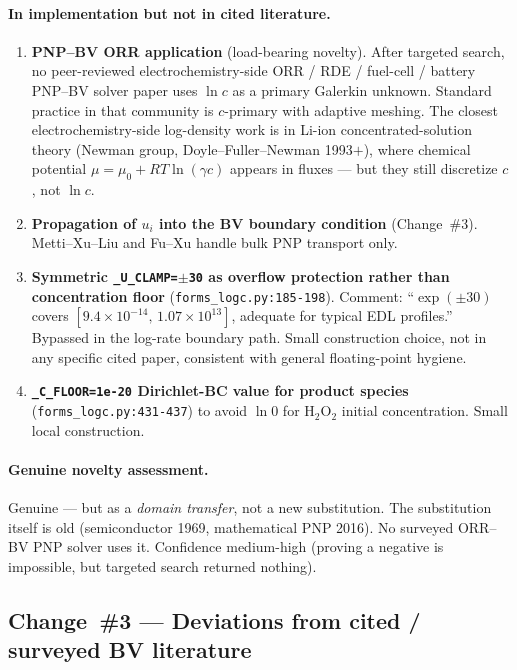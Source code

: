 \documentclass[11pt]{article}
\newcommand{\HtwoOtwo}{\mathrm{H}_2\mathrm{O}_2}
\begin{document}
\paragraph{In implementation but not in cited literature.}
\begin{enumerate}
\item \textbf{PNP--BV ORR application} (load-bearing novelty). After targeted
      search, no peer-reviewed electrochemistry-side ORR / RDE / fuel-cell /
      battery PNP--BV solver paper uses $\ln c$ as a primary Galerkin unknown.
      Standard practice in that community is $c$-primary with adaptive
      meshing. The closest electrochemistry-side log-density work is in Li-ion
      concentrated-solution theory (Newman group, Doyle--Fuller--Newman
      1993$+$), where chemical potential $\mu=\mu_0+RT\ln(\gamma c)$ appears
      in fluxes --- but they still discretize $c$, not $\ln c$.
\item \textbf{Propagation of $u_i$ into the BV boundary condition}
      (Change~\#3). Metti--Xu--Liu and Fu--Xu handle bulk PNP transport only.
\item \textbf{Symmetric \texttt{\_U\_CLAMP=$\pm$30} as overflow protection
      rather than concentration floor} (\texttt{forms\_logc.py:185-198}).
      Comment: ``$\exp(\pm 30)$ covers $[9.4\!\times\!10^{-14},\,1.07\!\times\!10^{13}]$,
      adequate for typical EDL profiles.'' Bypassed in the log-rate boundary
      path. Small construction choice, not in any specific cited paper,
      consistent with general floating-point hygiene.
\item \textbf{\texttt{\_C\_FLOOR=1e-20} Dirichlet-BC value for product
      species} (\texttt{forms\_logc.py:431-437}) to avoid $\ln 0$ for $\HtwoOtwo$
      initial concentration. Small local construction.
\end{enumerate}

\paragraph{Genuine novelty assessment.}
Genuine --- but as a \emph{domain transfer}, not a new substitution. The
substitution itself is old (semiconductor 1969, mathematical PNP 2016). No
surveyed ORR--BV PNP solver uses it. Confidence medium-high (proving a
negative is impossible, but targeted search returned nothing).

\subsection{Change~\#3 --- Deviations from cited / surveyed BV literature}
\end{document}
